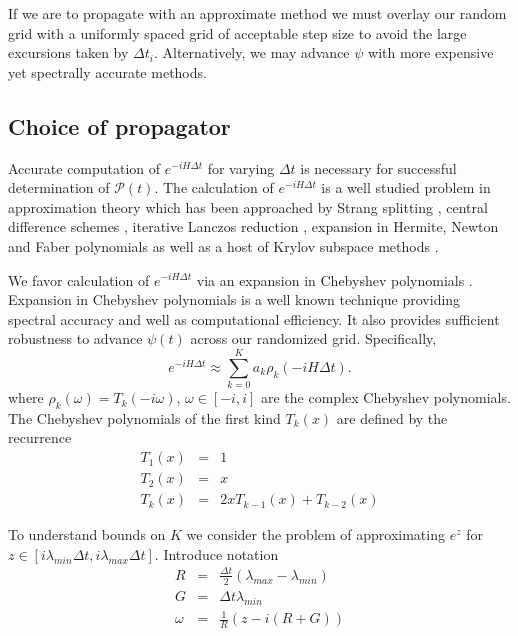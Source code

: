 \documentclass[11pt]{amsart}
\theoremstyle{remark}
\begin{document}
If we are to propagate with an approximate method we must overlay our random grid with a uniformly spaced grid of acceptable step size to avoid the large excursions taken by $\Delta t_i$. Alternatively, we may advance $\psi$ with more expensive yet spectrally accurate methods.

\subsection{Choice of propagator}

Accurate computation of $e^{-iH\Delta t}$ for varying $\Delta t$ is necessary for successful determination of $\mathcal{P}(t)$. The calculation of $e^{-iH\Delta t}$ is a well studied problem in approximation theory which has been approached by Strang splitting \cite{FEIT1982}, central difference schemes \cite{Fritz1983}, iterative Lanczos reduction \cite{Park1986}, expansion in Hermite, Newton and Faber polynomials \cite{Huang1994}\cite{Univcrsity1994}\cite{Vijay1999} as well as a host of Krylov subspace methods \cite{Moler2003}.

We favor calculation of $e^{-iH\Delta t}$ via an expansion in Chebyshev polynomials \cite{Aviv1984}. Expansion in Chebyshev polynomials is a well known technique providing spectral accuracy and well as computational efficiency. It also provides sufficient robustness to advance $\psi(t)$ across our randomized grid. Specifically,
\begin{equation}
e^{-iH\Delta t} \approx \sum_{k=0}^K a_k \rho_k (-iH\Delta t).
\end{equation}
where $\rho_k(\omega) = T_k(-i\omega)$, $\omega \in [-i,i]$ are the complex Chebyshev polynomials. The Chebyshev polynomials of the first kind $T_k(x)$ are defined by the recurrence
\begin{eqnarray}
T_1(x) &=& 1\\
T_2(x) &=& x\\
T_k(x) &=& 2xT_{k-1}(x) + T_{k-2}(x)
\end{eqnarray} 

To understand bounds on $K$ we consider the problem of approximating $e^z$ for $z \in [i \lambda_{min} \Delta t, i \lambda_{max} \Delta t]$. Introduce notation
\begin{eqnarray}
R &=& \frac{\Delta t}{2}(\lambda_{max} - \lambda_{min}) \\
G &=& \Delta t \lambda_{min} \\
\omega &=& \frac{1}{R}(z - i(R+G))\\
\end{eqnarray}
\end{document}
